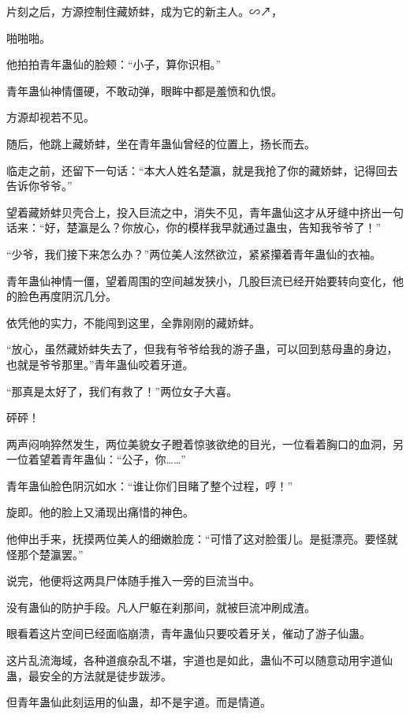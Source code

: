 
\begin{this_body}

片刻之后，方源控制住藏娇蚌，成为它的新主人。∽↗，

啪啪啪。

他拍拍青年蛊仙的脸颊：“小子，算你识相。”

青年蛊仙神情僵硬，不敢动弹，眼眸中都是羞愤和仇恨。

方源却视若不见。

随后，他跳上藏娇蚌，坐在青年蛊仙曾经的位置上，扬长而去。

临走之前，还留下一句话：“本大人姓名楚瀛，就是我抢了你的藏娇蚌，记得回去告诉你爷爷。”

望着藏娇蚌贝壳合上，投入巨流之中，消失不见，青年蛊仙这才从牙缝中挤出一句话来：“好，楚瀛是么？你放心，你的模样我早就通过蛊虫，告知我爷爷了！”

“少爷，我们接下来怎么办？”两位美人泫然欲泣，紧紧攥着青年蛊仙的衣袖。

青年蛊仙神情一僵，望着周围的空间越发狭小，几股巨流已经开始要转向变化，他的脸色再度阴沉几分。

依凭他的实力，不能闯到这里，全靠刚刚的藏娇蚌。

“放心，虽然藏娇蚌失去了，但我有爷爷给我的游子蛊，可以回到慈母蛊的身边，也就是爷爷那里。”青年蛊仙咬着牙道。

“那真是太好了，我们有救了！”两位女子大喜。

砰砰！

两声闷响猝然发生，两位美貌女子瞪着惊骇欲绝的目光，一位看着胸口的血洞，另一位着望着青年蛊仙：“公子，你……”

青年蛊仙脸色阴沉如水：“谁让你们目睹了整个过程，哼！”

旋即。他的脸上又涌现出痛惜的神色。

他伸出手来，抚摸两位美人的细嫩脸庞：“可惜了这对脸蛋儿。是挺漂亮。要怪就怪那个楚瀛罢。”

说完，他便将这两具尸体随手推入一旁的巨流当中。

没有蛊仙的防护手段。凡人尸躯在刹那间，就被巨流冲刷成渣。

眼看着这片空间已经面临崩溃，青年蛊仙只要咬着牙关，催动了游子仙蛊。

这片乱流海域，各种道痕杂乱不堪，宇道也是如此，蛊仙不可以随意动用宇道仙蛊，最安全的方法就是徒步跋涉。

但青年蛊仙此刻运用的仙蛊，却不是宇道。而是情道。


\end{this_body}
